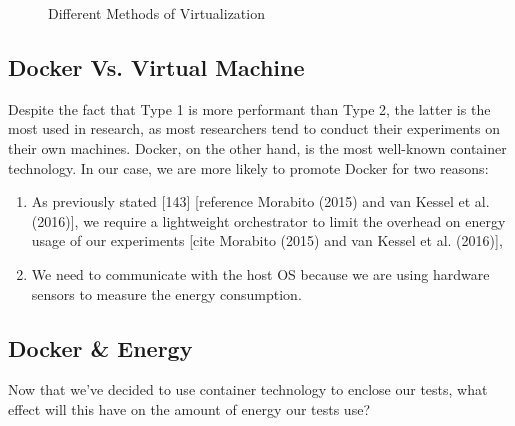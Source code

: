 \begin{figure}
    \caption{Different Methods of Virtualization}\label{environement:virtualization_technique}
\end{figure}


\subsection{Docker Vs. Virtual Machine}
Despite the fact that Type 1 is more performant than Type 2, the latter is the most used in research, as most researchers tend to conduct their experiments on their own machines. Docker, on the other hand, is the most well-known container technology. In our case, we are more likely to promote Docker for two reasons:
\begin{enumerate}
    \item As previously stated [143] [reference Morabito (2015) and van Kessel et al. (2016)], we require a lightweight orchestrator to limit the overhead on energy usage of our experiments
          \cite{van2016power}
          [cite Morabito (2015) and van Kessel et al. (2016)],
    \item We need to communicate with the host OS because we are using hardware sensors to measure the energy consumption.
\end{enumerate}



\subsection{Docker \& Energy}
Now that we've decided to use container technology to enclose our tests, what effect will this have on the amount of energy our tests use?

